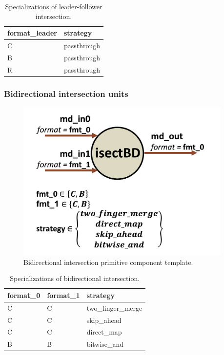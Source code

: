 \begin{table}[H]
\centering
\begin{tabular}{ll}
\toprule
 format\_leader   & strategy    \\
\midrule
 C               & passthrough \\
 B               & passthrough \\
 R               & passthrough \\
\bottomrule
\end{tabular}
\caption{Specializations of leader-follower intersection.}
\label{tab:IntersectionLeaderFollower_specializations}
\end{table}

\subsubsection{Bidirectional intersection units}

\begin{figure}[H]
    \centering
    \includegraphics[width=0.95\textwidth]{figures/isectbd.png}
    \caption{Bidirectional intersection primitive component template.}
    \label{fig:isectbd}
\end{figure}

\begin{table}[H]
\centering
\begin{tabular}{lll}
\toprule
 format\_0   & format\_1   & strategy         \\
\midrule
 C          & C          & two\_finger\_merge \\
 C          & C          & skip\_ahead       \\
 C          & C          & direct\_map       \\
 B          & B          & bitwise\_and      \\
\bottomrule
\end{tabular}
\caption{Specializations of bidirectional intersection.}
\label{tab:IntersectionBidirectional_specializations}
\end{table}

